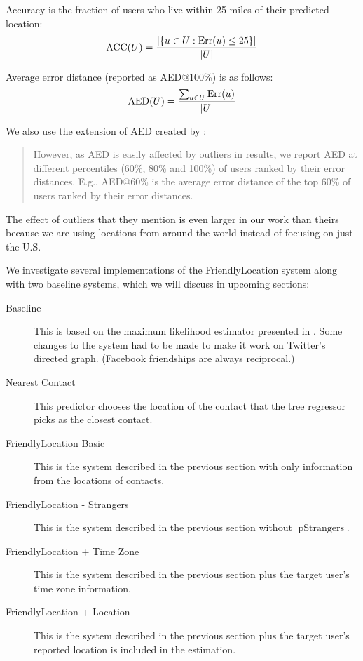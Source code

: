\documentclass[letterpaper]{article}
\DeclareMathOperator{\pStrangers}{pStrangers}
\DeclareMathOperator{\Err}{Err}
\DeclareMathOperator{\AED}{AED}
\DeclareMathOperator{\ACC}{ACC}
\begin{document}
Accuracy is the fraction of users who live within 25 miles of their predicted
location:
\[
    \ACC(U) = { |\{ u \in U : \Err(u)\le25 \}| \over |U| }
\]

Average error distance (reported as AED@100\%) is as follows:
\[
    \AED(U) = { \sum_{u \in U} \Err(u) \over |U| }
\]

We also use the extension of AED created by \cite{li2012towards}:
\begin{quote}
However, as AED is easily affected by outliers in results, we report AED at
different percentiles (60\%, 80\% and 100\%) of users ranked by their error
distances. E.g., AED@60\% is the average error distance of the top 60\% of
users ranked by their error distances.
\end{quote}
The effect of outliers that they mention is even larger in our work than theirs
because we are using locations from around the world instead of focusing on
just the U.S.

We investigate several implementations of the FriendlyLocation system along
with two baseline systems, which we will discuss in upcoming sections:
\begin{description}
\item[Baseline] This is based on the maximum likelihood estimator presented in
    \cite{backstrom2010find}. Some changes to the system had to be made to make it
    work on Twitter's directed graph. (Facebook friendships are always
    reciprocal.)
\item[Nearest Contact] This predictor chooses the location of the contact that
    the tree regressor picks as the closest contact.
\item[FriendlyLocation Basic] This is the system described in the previous
    section with only information from the locations of contacts.
\item[FriendlyLocation - Strangers] This is the system described in the previous
    section without $\pStrangers$.
\ifdefined\THESIS
\item[FriendlyLocation + Time Zone] This is the system described in the previous
    section plus the target user's time zone information.
\fi
\item[FriendlyLocation + Location] This is the system described in the previous
    section plus the target user's reported location is included in the
    estimation.
\end{description}
\end{document}

